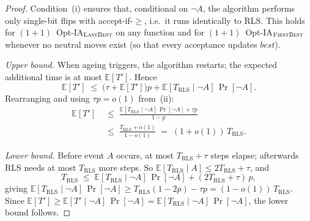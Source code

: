 \documentclass[lettersize,journal]{IEEEtran}
\newcommand{\rerev}[1]{\textcolor{black}{#1}}
\newcommand{\EE}{\mathbb{E}}
\newcommand{\linHD}{M$_{\text{linHD}}$}
\newcommand{\IPHfcm}{IPH}
\newcommand{\firstBest}{$(1+1)$~Opt-IA$_{\textsc{FirstBest}}$}
\newcommand{\lastBest}{$(1+1)$~Opt-IA$_{\textsc{LastBest}}$}
\newtheorem{theorem}{Theorem}
\begin{document}
\begin{proof}
Condition~(i) ensures that, conditional on $\lnot A$, the algorithm performs
only single-bit flips with accept-if-$\geq$, i.e.\ it runs identically to RLS.
This holds for \lastBest{} on any function and for \firstBest{} whenever
no neutral moves exist (so that every acceptance updates $\mathit{best}$).

\textit{Upper bound.}
When ageing triggers, the algorithm restarts; the expected additional time is
at most $\EE[T']$.  Hence
\[
  \EE[T'] \;\leq\;
    \bigl(\tau + \EE[T']\bigr)p
    + \EE[T_{\mathrm{RLS}}\mid\lnot A]\,\Pr[\lnot A].
\]
Rearranging and using $\tau p=o(1)$ from~(ii):
\begin{align*}
  \EE[T'] &\;\leq\;
  \frac{\EE[T_{\mathrm{RLS}}\mid\lnot A]\,\Pr[\lnot A]+\tau p}{1-p}\\
 & \;\leq\;
  \frac{T_{\mathrm{RLS}}+o(1)}{1-o(1)}
  \;=\; (1+o(1))\,T_{\mathrm{RLS}}.
\end{align*}

\textit{Lower bound.}
Before event $A$ occurs, at most $T_{\mathrm{RLS}}+\tau$ steps elapse;
afterwards RLS needs at most $T_{\mathrm{RLS}}$ more steps.  So
$\EE[T_{\mathrm{RLS}}\mid A]\leq 2T_{\mathrm{RLS}}+\tau$, and
\[
  T_{\mathrm{RLS}} \;\leq\;
    \EE[T_{\mathrm{RLS}}\mid\lnot A]\,\Pr[\lnot A]
    + (2T_{\mathrm{RLS}}+\tau)\,p,
\]
giving $\EE[T_{\mathrm{RLS}}\mid\lnot A]\,\Pr[\lnot A]
\geq T_{\mathrm{RLS}}(1-2p)-\tau p=(1-o(1))\,T_{\mathrm{RLS}}$.
Since $\EE[T']\geq\EE[T'\mid\lnot A]\,\Pr[\lnot A]
=\EE[T_{\mathrm{RLS}}\mid\lnot A]\,\Pr[\lnot A]$, the lower bound
follows.
\end{proof}

%
%
%
\end{document}
